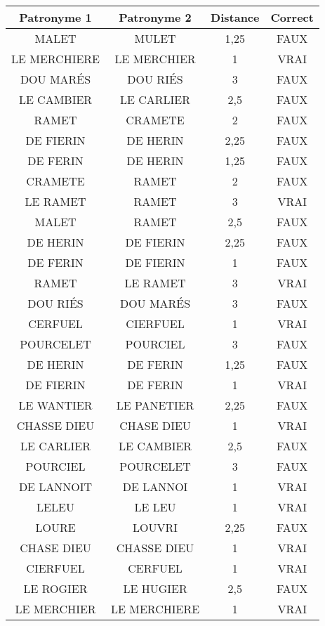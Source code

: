 \small
\begin{center}
    \begin{longtable}{|c|c|c|c|}
\hline	Patronyme 1	&	Patronyme 2	&	Distance	&	Correct	\\
\hline
\hline	MALET	&	MULET	&	1,25	&	FAUX	\\
\hline	LE MERCHIERE	&	LE MERCHIER	&	1	&	VRAI	\\
\hline	DOU MARÉS	&	DOU RIÉS	&	3	&	FAUX	\\
\hline	LE CAMBIER	&	LE CARLIER	&	2,5	&	FAUX	\\
\hline	RAMET	&	CRAMETE	&	2	&	FAUX	\\
\hline	DE FIERIN	&	DE HERIN	&	2,25	&	FAUX	\\
\hline	DE FERIN	&	DE HERIN	&	1,25	&	FAUX	\\
\hline	CRAMETE	&	RAMET	&	2	&	FAUX	\\
\hline	LE RAMET	&	RAMET	&	3	&	VRAI	\\
\hline	MALET	&	RAMET	&	2,5	&	FAUX	\\
\hline	DE HERIN	&	DE FIERIN	&	2,25	&	FAUX	\\
\hline	DE FERIN	&	DE FIERIN	&	1	&	FAUX	\\
\hline	RAMET	&	LE RAMET	&	3	&	VRAI	\\
\hline	DOU RIÉS	&	DOU MARÉS	&	3	&	FAUX	\\
\hline	CERFUEL	&	CIERFUEL	&	1	&	VRAI	\\
\hline	POURCELET	&	POURCIEL	&	3	&	FAUX	\\
\hline	DE HERIN	&	DE FERIN	&	1,25	&	FAUX	\\
\hline	DE FIERIN	&	DE FERIN	&	1	&	VRAI	\\
\hline	LE WANTIER	&	LE PANETIER	&	2,25	&	FAUX	\\
\hline	CHASSE DIEU	&	CHASE DIEU	&	1	&	VRAI	\\
\hline	LE CARLIER	&	LE CAMBIER	&	2,5	&	FAUX	\\
\hline	POURCIEL	&	POURCELET	&	3	&	FAUX	\\
\hline	DE LANNOIT	&	DE LANNOI	&	1	&	VRAI	\\
\hline	LELEU	&	LE LEU	&	1	&	VRAI	\\
\hline	LOURE	&	LOUVRI	&	2,25	&	FAUX	\\
\hline	CHASE DIEU	&	CHASSE DIEU	&	1	&	VRAI	\\
\hline	CIERFUEL	&	CERFUEL	&	1	&	VRAI	\\
\hline	LE ROGIER	&	LE HUGIER	&	2,5	&	FAUX	\\
\hline	LE MERCHIER	&	LE MERCHIERE	&	1	&	VRAI	\\

\end{longtable}
\end{center}
